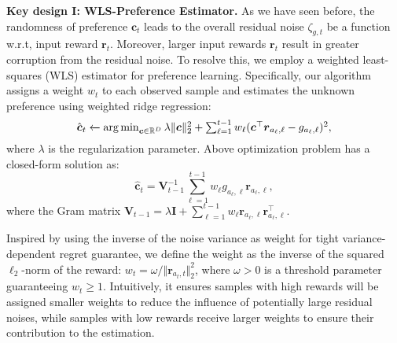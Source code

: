 \textbf{Key design I: WLS-Preference Estimator.}
As we have seen before, the randomness of preference $\boldsymbol{c}_t$ leads to the overall residual noise $\zeta_{g,t}$ be a function w.r.t, input reward $\boldsymbol{r}_t$. Moreover, larger input rewards $\boldsymbol{r}_t$ result in greater corruption from the residual noise.
To resolve this, we employ a weighted least-squares (WLS) estimator for preference learning. Specifically, our algorithm assigns a weight $w_t$ to each observed sample and estimates the unknown preference using weighted ridge regression:
\[
\textstyle
\hat{\boldsymbol{c}}_t \xleftarrow{} \operatorname*{arg\,min}_{\boldsymbol{c} \in \mathbb{R}^{D}} \lambda \Vert \boldsymbol{c} \Vert_2^2 
+
\sum_{\ell=1}^{t-1} w_{\ell} ( {\boldsymbol{c}}^{\top} \boldsymbol{r}_{a_{\ell},\ell} - g_{a_{\ell},\ell})^2,
\]
where $\lambda$ is the regularization parameter. Above optimization problem has a closed-form solution as:
\begin{equation}
\label{eq:hpm_c_t}
\textstyle
\boldsymbol{\hat{c}}_{t} = \boldsymbol{V}_{t-1}^{-1} \sum_{\ell=1}^{t-1} w_{\ell} g_{a_{\ell}, \ell} \boldsymbol{r}_{a_{\ell},\ell},
\end{equation}
where the Gram matrix $\boldsymbol{V}_{t-1} = \lambda \boldsymbol{I} + \sum_{\ell=1}^{t-1} w_{\ell} \boldsymbol{r}_{a_{\ell},\ell} \boldsymbol{r}_{a_{\ell},\ell}^{\top}$.



Inspired by \cite{zhou2021nearly} using the inverse of the noise variance as weight 
for tight variance-dependent regret guarantee, 
we define the weight as the inverse of the squared $\ell_2$-norm of the reward: $w_t = \omega / \Vert \boldsymbol{r}_{a_t,t} \Vert_2^2$, where $\omega > 0$ is a threshold parameter guaranteeing $w_t \geq 1$. 
Intuitively, it ensures samples with high rewards will be assigned smaller weights to reduce the influence of potentially large residual noises, while samples with low rewards receive larger weights to ensure their contribution to the estimation.

